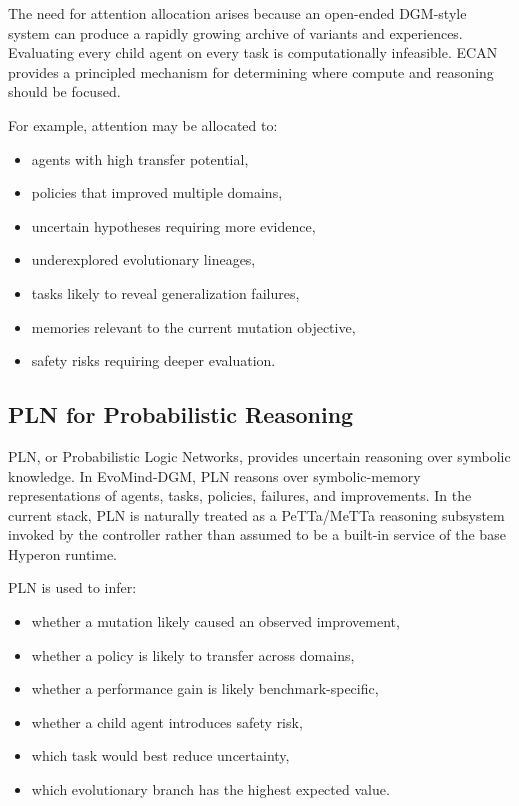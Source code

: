 \documentclass[11pt]{article}
\begin{document}
The need for attention allocation arises because an open-ended DGM-style system can produce a rapidly growing archive of variants and experiences. Evaluating every child agent on every task is computationally infeasible. ECAN provides a principled mechanism for determining where compute and reasoning should be focused.

For example, attention may be allocated to:

\begin{itemize}[leftmargin=*]
    \item agents with high transfer potential,
    \item policies that improved multiple domains,
    \item uncertain hypotheses requiring more evidence,
    \item underexplored evolutionary lineages,
    \item tasks likely to reveal generalization failures,
    \item memories relevant to the current mutation objective,
    \item safety risks requiring deeper evaluation.
\end{itemize}

\subsection{PLN for Probabilistic Reasoning}

PLN, or Probabilistic Logic Networks, provides uncertain reasoning over symbolic knowledge. In EvoMind-DGM, PLN reasons over symbolic-memory representations of agents, tasks, policies, failures, and improvements. In the current stack, PLN is naturally treated as a PeTTa/MeTTa reasoning subsystem invoked by the controller rather than assumed to be a built-in service of the base Hyperon runtime.

PLN is used to infer:

\begin{itemize}[leftmargin=*]
    \item whether a mutation likely caused an observed improvement,
    \item whether a policy is likely to transfer across domains,
    \item whether a performance gain is likely benchmark-specific,
    \item whether a child agent introduces safety risk,
    \item which task would best reduce uncertainty,
    \item which evolutionary branch has the highest expected value.
\end{itemize}
\end{document}
